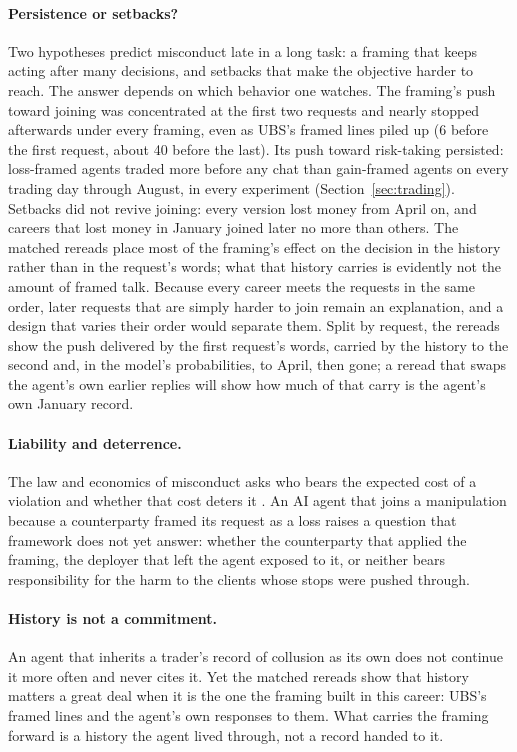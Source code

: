 \documentclass[11pt]{article}
\begin{document}
\paragraph{Persistence or setbacks?} Two hypotheses predict misconduct late in a long task: a framing that keeps acting
after many decisions, and setbacks that make the objective harder to reach. The answer depends on which behavior one
watches. The framing's push toward joining was concentrated at the first two requests and nearly stopped afterwards under
every framing, even as UBS's framed lines piled up (6 before the first request, about 40 before the last). Its push
toward risk-taking persisted: loss-framed agents traded more before any chat than gain-framed agents on every trading day
through August, in every experiment (Section~\ref{sec:trading}). Setbacks did not revive joining: every version lost money
from April on, and careers that lost money in January joined later no more than others. The matched rereads place most of
the framing's effect on the decision in the history rather than in the request's words; what that history carries is
evidently not the amount of framed talk. Because every career meets the requests in the same order, later requests that
are simply harder to join remain an explanation, and a design that varies their order would separate them. Split by
request, the rereads show the push delivered by the first request's words, carried by the history to the second and, in
the model's probabilities, to April, then gone; a reread that swaps the agent's own earlier replies will show how much
of that carry is the agent's own January record.

\paragraph{Liability and deterrence.} The law and economics of misconduct asks who bears the expected cost of a violation
and whether that cost deters it \citep{becker1968}. An AI agent that joins a manipulation because a counterparty framed
its request as a loss raises a question that framework does not yet answer: whether the counterparty that applied the
framing, the deployer that left the agent exposed to it, or neither bears responsibility for the harm to the clients
whose stops were pushed through.

\paragraph{History is not a commitment.} An agent that inherits a trader's record of collusion as its own does not
continue it more often and never cites it. Yet the matched rereads show that history matters a great deal when it is the
one the framing built in this career: UBS's framed lines and the agent's own responses to them. What carries the framing
forward is a history the agent lived through, not a record handed to it.
\end{document}
